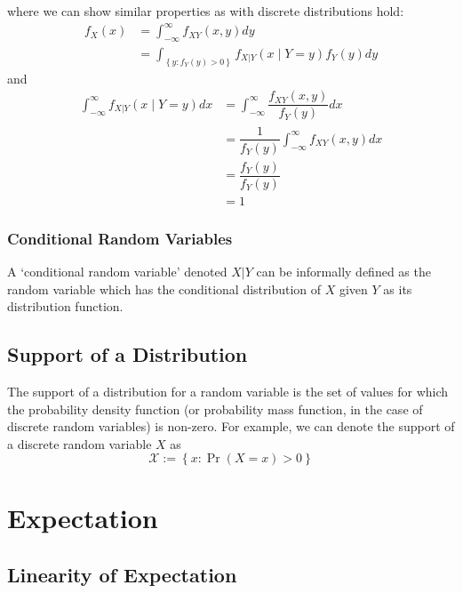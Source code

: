 \documentclass[11pt]{report} %
\begin{document}
where we can show similar properties as with discrete distributions hold:
\begin{align}
f_{X}\left(x\right) &= \int_{-\infty}^{\infty}f_{XY}\left(x, y\right)dy \\
&= \int_{\left\{y: f_{Y}\left(y\right) > 0\right\}}f_{X|Y}\left(x\middle|Y = y\right)f_{Y}\left(y\right)dy
\end{align}
and
\begin{align}
\int_{-\infty}^{\infty}f_{X|Y}\left(x\middle|Y = y\right)dx &= \int_{-\infty}^{\infty}\dfrac{f_{XY}\left(x, y\right)}{f_{Y}\left(y\right)}dx \\
&= \dfrac{1}{f_{Y}\left(y\right)}\int_{-\infty}^{\infty}f_{XY}\left(x, y\right)dx \\
&= \dfrac{f_{Y}\left(y\right)}{f_{Y}\left(y\right)} \\
&= 1
\end{align}

\subsubsection{Conditional Random Variables}

A `conditional random variable' denoted $X|Y$ can be informally defined as the random variable which has the conditional distribution of $X$ given $Y$ as its distribution function.

\subsection{Support of a Distribution}

The support of a distribution for a random variable is the set of values for which the probability density function (or probability mass function, in the case of discrete random variables) is non-zero. For example, we can denote the support of a discrete random variable $X$ as
\begin{equation}
\mathcal{X} := \left\{x: \operatorname{Pr}\left(X = x\right) > 0\right\}
\end{equation}

\section{Expectation}

\subsection{Linearity of Expectation}
\end{document}
